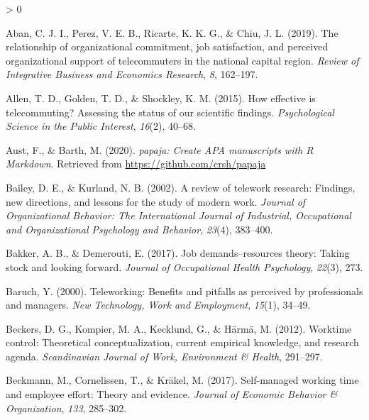 \documentclass[
  english,
  man]{apa6}
\newlength{\cslhangindent}
\newenvironment{CSLReferences}[2] %
 {%
  \setlength{\parindent}{0pt}
  \ifodd #1 \everypar{\setlength{\hangindent}{\cslhangindent}}\ignorespaces\fi
  \ifnum #2 > 0
  \setlength{\parskip}{#2\baselineskip}
  \fi
 }%
 {}
\begin{document}
\begingroup
\setlength{\parindent}{-0.5in}
\setlength{\leftskip}{0.5in}

\hypertarget{refs}{}
\begin{CSLReferences}{1}{0}
\leavevmode\hypertarget{ref-aban_relationship_2019}{}%
Aban, C. J. I., Perez, V. E. B., Ricarte, K. K. G., \& Chiu, J. L. (2019). The relationship of organizational commitment, job satisfaction, and perceived organizational support of telecommuters in the national capital region. \emph{Review of Integrative Business and Economics Research}, \emph{8}, 162--197.

\leavevmode\hypertarget{ref-allen_how_2015}{}%
Allen, T. D., Golden, T. D., \& Shockley, K. M. (2015). How effective is telecommuting? Assessing the status of our scientific findings. \emph{Psychological Science in the Public Interest}, \emph{16}(2), 40--68.

\leavevmode\hypertarget{ref-R-papaja}{}%
Aust, F., \& Barth, M. (2020). \emph{{papaja}: {Create} {APA} manuscripts with {R Markdown}}. Retrieved from \url{https://github.com/crsh/papaja}

\leavevmode\hypertarget{ref-bailey_review_2002}{}%
Bailey, D. E., \& Kurland, N. B. (2002). A review of telework research: Findings, new directions, and lessons for the study of modern work. \emph{Journal of Organizational Behavior: The International Journal of Industrial, Occupational and Organizational Psychology and Behavior}, \emph{23}(4), 383--400.

\leavevmode\hypertarget{ref-bakker_job_2017}{}%
Bakker, A. B., \& Demerouti, E. (2017). Job demands--resources theory: Taking stock and looking forward. \emph{Journal of Occupational Health Psychology}, \emph{22}(3), 273.

\leavevmode\hypertarget{ref-baruch_teleworking_2000}{}%
Baruch, Y. (2000). Teleworking: Benefits and pitfalls as perceived by professionals and managers. \emph{New Technology, Work and Employment}, \emph{15}(1), 34--49.

\leavevmode\hypertarget{ref-beckers_worktime_2012}{}%
Beckers, D. G., Kompier, M. A., Kecklund, G., \& Härmä, M. (2012). Worktime control: Theoretical conceptualization, current empirical knowledge, and research agenda. \emph{Scandinavian Journal of Work, Environment \& Health}, 291--297.

\leavevmode\hypertarget{ref-beckmann_self-managed_2017}{}%
Beckmann, M., Cornelissen, T., \& Kräkel, M. (2017). Self-managed working time and employee effort: Theory and evidence. \emph{Journal of Economic Behavior \& Organization}, \emph{133}, 285--302.


\end{CSLReferences}
\end{document}
